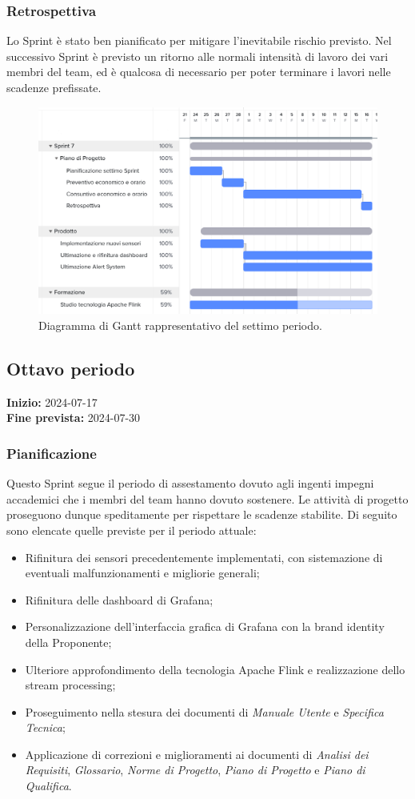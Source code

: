 \documentclass[8pt]{article}
\begin{document}
\subsubsection{Retrospettiva}
Lo Sprint è stato ben pianificato per mitigare l'inevitabile rischio previsto. Nel successivo Sprint è previsto un ritorno alle normali intensità di lavoro dei vari membri del team, ed è qualcosa di necessario per poter terminare i lavori nelle scadenze prefissate.
\begin{figure}[h!]
    \centering
    \includegraphics[width=13cm]{./images_pdp/gantt7.png}
    \caption{Diagramma di Gantt rappresentativo del settimo periodo.}
\end{figure}
\clearpage
\newpage
\subsection{Ottavo periodo}
\textbf{Inizio:} 2024-07-17\\
\textbf{Fine prevista:} 2024-07-30
\subsubsection{Pianificazione}
Questo Sprint segue il periodo di assestamento dovuto agli ingenti impegni accademici che i membri del team hanno dovuto sostenere. Le attività di progetto proseguono dunque speditamente per rispettare le scadenze stabilite. Di seguito sono elencate quelle previste per il periodo attuale:
\begin{itemize}
\setlength\itemsep{0em}
    \item Rifinitura dei sensori precedentemente implementati, con sistemazione di eventuali malfunzionamenti e migliorie generali;
    \item Rifinitura delle dashboard di Grafana;
    \item Personalizzazione dell'interfaccia grafica di Grafana con la brand identity della Proponente;
    \item Ulteriore approfondimento della tecnologia Apache Flink e realizzazione dello stream processing;
    \item Proseguimento nella stesura dei documenti di \textit{Manuale Utente} e \textit{Specifica Tecnica};
    \item Applicazione di correzioni e miglioramenti ai documenti di \textit{Analisi dei Requisiti}, \textit{Glossario}, \textit{Norme di Progetto}, \textit{Piano di Progetto} e \textit{Piano di Qualifica}.
\end{itemize}
\end{document}
